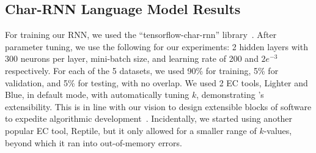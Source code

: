 \subsection{Char-RNN Language Model Results}
For training our RNN, we used the ``tensorflow-char-rnn'' library~\cite{45381}. After parameter tuning, we use the following for our experiments: 2 hidden layers with 300 neurons per layer, mini-batch size, and learning rate of 200 and $2 e^{-3}$ respectively.
For each of the 5 datasets, we used 90\% for training, 5\% for validation, and 5\% for testing, with no overlap.
We used 2 EC tools, Lighter and Blue, in default mode, with \name automatically tuning $k$, demonstrating \name's extensibility. This is in line with our vision to design extensible blocks of software to expedite algorithmic development~\cite{mahadik2016sarvavid}. Incidentally, we started using another popular EC tool, Reptile, but it only allowed for a smaller range of $k$-values, beyond which it ran into out-of-memory errors. %

